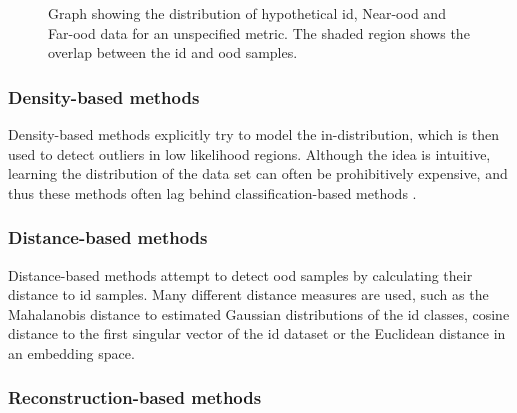 \documentclass[UKenglish]{uiomasterthesis} %
\theoremstyle{definition}
\begin{document}
\begin{figure}[h]
    \begin{center}
        
    \end{center}
    \caption[Hypothetical \ac{id}/\ac{ood} distributions for an \ac{ood} detection metric]{Graph showing the distribution of hypothetical \ac{id}, Near-\ac{ood} and Far-\ac{ood} data for an unspecified metric. The shaded region shows the overlap between the \ac{id} and \ac{ood} samples.}
    \label{fig:ood_metric}
\end{figure}




\subsubsection{Density-based methods}

Density-based methods explicitly try to model the in-distribution, which is then used to detect outliers in low likelihood regions. Although the idea is intuitive, learning the distribution of the data set can often be prohibitively expensive, and thus these methods often lag behind classification-based methods \cite{oodoverview}.
\\

\subsubsection{Distance-based methods} \label{section:distancebasedood}

Distance-based methods attempt to detect \ac{ood} samples by calculating their distance to \ac{id} samples. Many different distance measures are used, such as the Mahalanobis distance to estimated Gaussian distributions of the \ac{id} classes, cosine distance to the first singular vector of the \ac{id} dataset or the Euclidean distance in an embedding space.
\\

\subsubsection{Reconstruction-based methods}
\end{document}
